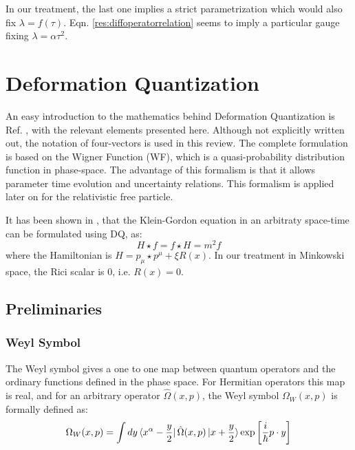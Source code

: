 \documentclass[a4paper,10pt]{article}
\numberwithin{equation}{section}
\begin{document}
In our treatment, the last one implies a strict parametrization which would also fix $\lambda = f(\tau)$. Eqn. \ref{res:diffoperatorrelation} seems to imply a particular gauge fixing $\lambda = \alpha \tau^2$.








\newpage
\iffalse
\section{Deformation Quantization}
An easy introduction to the mathematics behind Deformation Quantization is Ref. \cite{DefQuantPhys}, with the relevant elements presented here. Although not explicitly written out, the notation of four-vectors is used in this review. The complete formulation is based on the Wigner Function (WF), which is a quasi-probability distribution function in phase-space. The advantage of this formalism is that it allows parameter time evolution and uncertainty relations. This formalism is applied later on for the relativistic free particle.

It has been shown in \cite{TillmanSparling:KGinDQ}, that the Klein-Gordon equation in an arbitraty space-time can be formulated using DQ, as:
\begin{equation}
    H \star f = f \star H = m^2 f
\end{equation}
where the Hamiltonian is $H = p_\mu \star p^\mu + \xi R(x)$. In our treatment in Minkowski space, the Rici scalar is 0, i.e. $R(x) = 0$.

\subsection{Preliminaries}
\subsubsection{Weyl Symbol}

The Weyl symbol gives a one to one map between quantum operators and the ordinary functions defined in the phase space. For Hermitian operators this map is real, and for an arbitrary operator $\hat{\Omega}(x,p)$, the Weyl symbol $\Omega_W(x,p)$ is formally defined as:
\begin{equation}
    \Omega_W(x,p) = \int dy \bra{x^\alpha - \frac{y}{2}}\hat{\Omega}(x,p) \ket{x + \frac{y}{2}}\exp\left[\frac{i}{\hbar}p\cdot y\right]
\end{equation}
\end{document}
